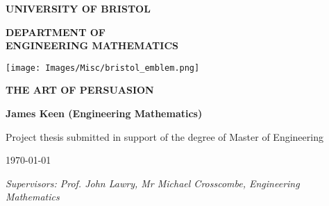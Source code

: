 \begin{titlepage}

\vspace*{1cm}

\begin{center}
    \textbf{\LARGE UNIVERSITY OF BRISTOL}
    
    \vspace{3em}
    
    \textbf{\Huge DEPARTMENT OF \\ \vspace{0.5em} ENGINEERING MATHEMATICS}
    
\end{center}
\vspace{3cm}

\center
\texttt{[image: Images/Misc/bristol\_emblem.png]}\par\vspace{1cm}

\vspace{2.5cm}

{ \huge \bfseries THE ART OF PERSUASION
}\\

\vspace{3cm}

{ \large \bfseries James Keen (Engineering Mathematics)
}\\

\vspace{1.5cm}

{\large Project thesis submitted in support of the degree of Master of Engineering}

\vspace{0.7cm}

\today

\vspace{0.25em}


\raggedright \textit{Supervisors: Prof. John Lawry, Mr Michael Crosscombe,  Engineering Mathematics}

\end{titlepage}
